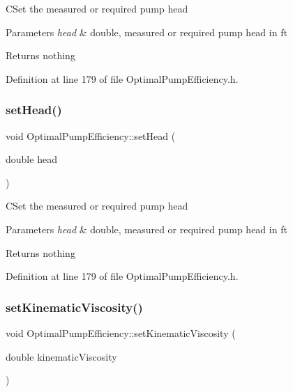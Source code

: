 C\+Set the measured or required pump head


\begin{DoxyParams}{Parameters}
{\em head} & double, measured or required pump head in ft\\
\hline
\end{DoxyParams}
\begin{DoxyReturn}{Returns}
nothing 
\end{DoxyReturn}


Definition at line 179 of file Optimal\+Pump\+Efficiency.\+h.

\mbox{\label{class_optimal_pump_efficiency_ac317c900ec68797cf051977147ea33da}} 
\subsubsection{\texorpdfstring{set\+Head()}{setHead()}\hspace{0.1cm}{\footnotesize\ttfamily [3/3]}}
{\footnotesize\ttfamily void Optimal\+Pump\+Efficiency\+::set\+Head (\begin{DoxyParamCaption}\item[{double}]{head }\end{DoxyParamCaption})\hspace{0.3cm}{\ttfamily [inline]}}

C\+Set the measured or required pump head


\begin{DoxyParams}{Parameters}
{\em head} & double, measured or required pump head in ft\\
\hline
\end{DoxyParams}
\begin{DoxyReturn}{Returns}
nothing 
\end{DoxyReturn}


Definition at line 179 of file Optimal\+Pump\+Efficiency.\+h.

\mbox{\label{class_optimal_pump_efficiency_a00017e0bd100beb2f4b0bf2db5e3687f}} 
\subsubsection{\texorpdfstring{set\+Kinematic\+Viscosity()}{setKinematicViscosity()}\hspace{0.1cm}{\footnotesize\ttfamily [1/3]}}
{\footnotesize\ttfamily void Optimal\+Pump\+Efficiency\+::set\+Kinematic\+Viscosity (\begin{DoxyParamCaption}\item[{double}]{kinematic\+Viscosity }\end{DoxyParamCaption})\hspace{0.3cm}{\ttfamily [inline]}}


